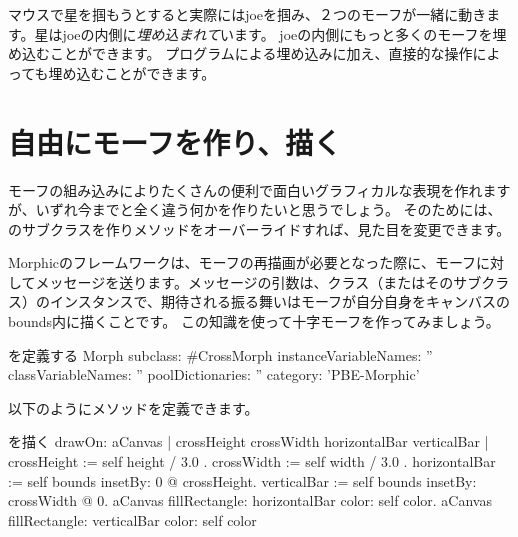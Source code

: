 \documentclass[a4paper,10pt,twoside]{book}
\begin{document}
マウスで星を掴もうとすると実際にはjoeを掴み、２つのモーフが一緒に動きます。星はjoeの内側に\emph{埋め込まれて}います。
joeの内側にもっと多くのモーフを埋め込むことができます。
プログラムによる埋め込みに加え、直接的な操作によっても埋め込むことができます。

\section{自由にモーフを作り、描く}

モーフの組み込みによりたくさんの便利で面白いグラフィカルな表現を作れますが、いずれ今までと全く違う何かを作りたいと思うでしょう。
そのためには、のサブクラスを作りメソッドをオーバーライドすれば、見た目を変更できます。

Morphicのフレームワークは、モーフの再描画が必要となった際に、モーフに対してメッセージを送ります。メッセージの引数は、クラス（またはそのサブクラス）のインスタンスで、期待される振る舞いはモーフが自分自身をキャンバスのbounds内に描くことです。
この知識を使って十字モーフを作ってみましょう。

\begin{classdef}{を定義する}
Morph subclass: #CrossMorph
	instanceVariableNames: ''
	classVariableNames: ''
	poolDictionaries: ''
	category: 'PBE-Morphic'
\end{classdef}

以下のようにメソッドを定義できます。
\begin{method}[firstDrawOn]{を描く}
drawOn: aCanvas 
	| crossHeight crossWidth horizontalBar verticalBar |
	crossHeight := self height / 3.0 .
	crossWidth := self width / 3.0 .
	horizontalBar := self bounds insetBy: 0 @ crossHeight.
	verticalBar := self bounds insetBy: crossWidth @ 0.
	aCanvas fillRectangle: horizontalBar color: self color.
	aCanvas fillRectangle: verticalBar color: self color
\end{method}
\end{document}
